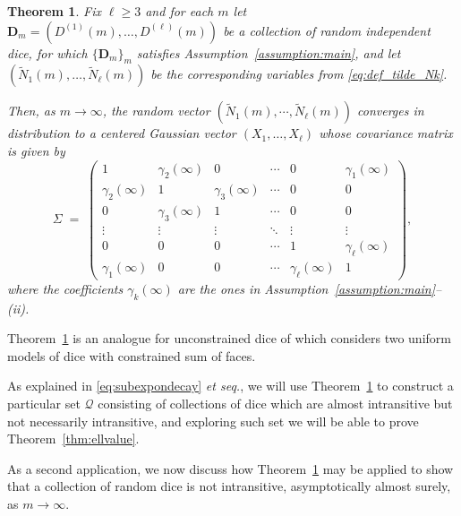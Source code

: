 \documentclass[reqno,a4paper,11pt]{amsart}
\newtheorem{theorem}[lemma]{Theorem}
\theoremstyle{remark}
\newcommand{\mc}[1]{{\mathcal #1}}
\newcommand{\mb}[1]{{\mathbf #1}}
\numberwithin{equation}{section}
\begin{document}
\begin{theorem}\label{teo:CLT}
Fix $\ell\geq 3$ and for each $m$ let $\mb D_m=(D^{(1)}(m),\hdots, D^{(\ell)}(m))$ be a collection of random independent dice, for which $\{\mb D_m\}_m$ satisfies Assumption~\ref{assumption:main}, and let $(\widetilde N_1(m),\ldots, \widetilde N_\ell(m))$ be the corresponding variables from \eqref{eq:def_tilde_Nk}.

Then, as $m\to\infty$, the random vector $(\widetilde N_1(m),\cdots, \widetilde N_\ell(m))$ converges in distribution to  a centered Gaussian vector $(X_1, \ldots, X_{\ell})$
whose covariance matrix is given by
%
\begin{equation}\label{eq:covariancematrixCLT}
\Sigma \;=\;\left(
\begin{array}{cccccccc}
1 & \gamma_2(\infty) & 0 & \cdots  & 0 &\gamma_1(\infty)\\
\gamma_2(\infty) & 1 & \gamma_3(\infty) & \cdots & 0 & 0\\
0 & \gamma_3(\infty) & 1 & \cdots& 0 & 0\\
\vdots & \vdots & \vdots & \ddots & \vdots & \vdots\\
0 & 0 & 0 & \cdots & 1 & \gamma_{\ell}(\infty)\\
\gamma_1(\infty) & 0 & 0 & \cdots & \gamma_{\ell}(\infty) & 1
\end{array}\right),
\end{equation}
where the coefficients $\gamma_k(\infty)$ are the ones in Assumption~\ref{assumption:main}--(ii).
\end{theorem}

Theorem~\ref{teo:CLT} is an analogue for unconstrained dice of \cite[Theorem~1.4]{PTRF2} which considers two uniform models of dice with constrained sum of faces.

As explained in \eqref{eq:subexpondecay} \textit{et seq.}, we will use Theorem~\ref{teo:CLT} to construct a particular set $\mc Q$ consisting of collections of dice which are almost intransitive but not necessarily intransitive, and exploring such set we will be able to prove Theorem~\ref{thm:ellvalue}. 

As a second application, we now discuss how Theorem~\ref{teo:CLT} may be
applied to show that a collection of random dice is not intransitive,
asymptotically almost surely, as $m\to\infty$.
\end{document}
